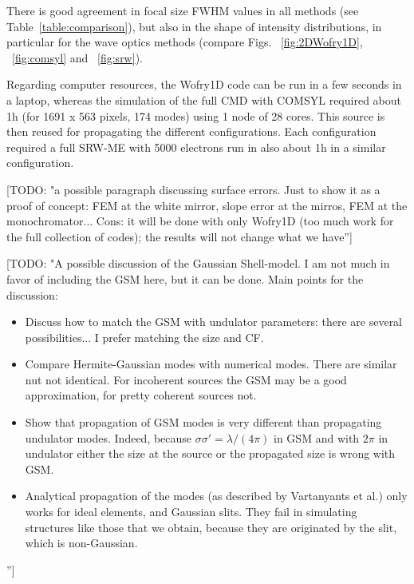 \documentclass{iucr}              %
\newcommand{\todo}[1]{{\color{red}[TODO: "#1'']}}
\begin{document}
There is good agreement in focal size FWHM values in all methods (see Table~\ref{table:comparison}), but also in the shape of intensity distributions, in particular for the wave optics methods (compare Figs. ~\ref{fig:2DWofry1D}, ~\ref{fig:comsyl} and ~\ref{fig:srw}). 

Regarding computer resources, the Wofry1D code can be run in a few seconds in a laptop, whereas the simulation of the full CMD with COMSYL required about 1h (for 1691 x 563 pixels, 174 modes) using 1 node of 28 cores. This source is then reused for propagating the different configurations. Each configuration required a full SRW-ME with 5000 electrons run in also about 1h in a similar configuration. 

\todo{a possible paragraph discussing surface errors. Just to show it as a proof of concept: FEM at the white mirror, slope error at the mirros, FEM at the monochromator... Cons: it will be done with only Wofry1D (too much work for the full collection of codes); the results will not change what we have}


\todo{A possible discussion of the Gaussian Shell-model. I am not much in favor of including the GSM here, but it can be done. Main points for the discussion:

\begin{itemize}
\item Discuss how to match the GSM with undulator parameters: there are several possibilities... I prefer matching the size and CF. 
\item Compare Hermite-Gaussian modes with numerical modes. There are similar nut not identical. For incoherent sources the GSM may be a good approximation, for pretty coherent sources not. 
\item Show that propagation of GSM modes is very different than propagating undulator modes. Indeed, because $\sigma \sigma' = \lambda / (4 \pi)$ in GSM and with $2\pi$ in undulator either the size at the source or the propagated size is wrong with GSM.
\item Analytical propagation of the modes (as described by Vartanyants et al.) only works for ideal elements, and Gaussian slits. They fail in simulating structures like those that we obtain, because they are originated by the slit, which is non-Gaussian.
\end{itemize}

}






\end{document}
